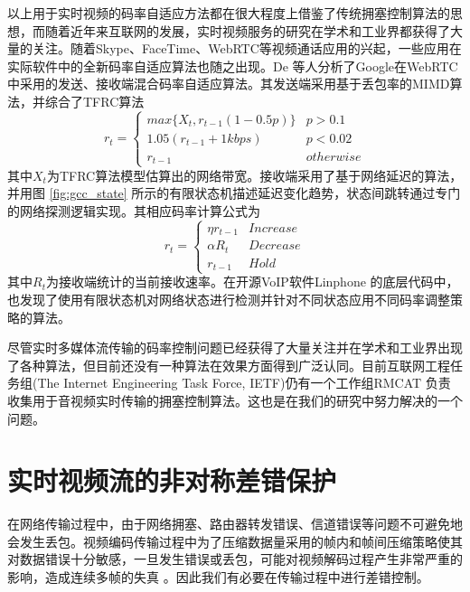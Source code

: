 以上用于实时视频的码率自适应方法都在很大程度上借鉴了传统拥塞控制算法的思想，而随着近年来互联网的发展，实时视频服务的研究在学术和工业界都获得了大量的关注。随着Skype、FaceTime、WebRTC等视频通话应用的兴起，一些应用在实际软件中的全新码率自适应算法也随之出现。De \cite{de2013experimental} 等人分析了Google在WebRTC中采用的发送、接收端混合码率自适应算法。其发送端采用基于丢包率的MIMD算法，并综合了TFRC算法
\begin{equation}
  r_t = \left\{ \begin{array}{ll}
    max\{X_t, r_{t-1}(1-0.5p)\} &   p > 0.1\\
    1.05(r_{t-1} + 1kbps)       &   p < 0.02\\
    r_{t-1}                     &   otherwise
  \end{array} \right.
\end{equation}
其中$X_t$为TFRC算法模型估算出的网络带宽。接收端采用了基于网络延迟的算法，并用图 \ref{fig:gcc_state} 所示的有限状态机描述延迟变化趋势，状态间跳转通过专门的网络探测逻辑实现。其相应码率计算公式为
\begin{equation}
  r_t = \left\{ \begin{array}{ll}
    \eta r_{t-1} &   Increase\\
    \alpha R_t   &   Decrease\\
    r_{t-1}      &   Hold
  \end{array} \right.
\end{equation}
其中$R_t$为接收端统计的当前接收速率。在开源VoIP软件Linphone \cite{website:linphone}的底层代码中，也发现了使用有限状态机对网络状态进行检测并针对不同状态应用不同码率调整策略的算法。

尽管实时多媒体流传输的码率控制问题已经获得了大量关注并在学术和工业界出现了各种算法，但目前还没有一种算法在效果方面得到广泛认同。目前互联网工程任务组(The Internet Engineering Task Force, IETF)仍有一个工作组RMCAT \cite{website:rmcat} 负责收集用于音视频实时传输的拥塞控制算法。这也是在我们的研究中努力解决的一个问题。


\section{实时视频流的非对称差错保护}
\label{section:fec_intro}
在网络传输过程中，由于网络拥塞、路由器转发错误、信道错误等问题不可避免地会发生丢包。视频编码传输过程中为了压缩数据量采用的帧内和帧间压缩策略使其对数据错误十分敏感，一旦发生错误或丢包，可能对视频解码过程产生非常严重的影响，造成连续多帧的失真 \cite{stockhammer2003h}。因此我们有必要在传输过程中进行差错控制。

